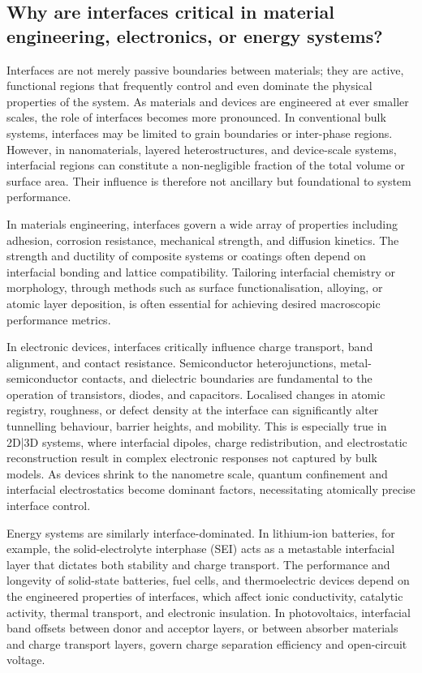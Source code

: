 \subsection{Why are interfaces critical in material engineering, electronics, or energy systems?}

Interfaces are not merely passive boundaries between materials; they are active, functional regions that frequently control and even dominate the physical properties of the system. As materials and devices are engineered at ever smaller scales, the role of interfaces becomes more pronounced. In conventional bulk systems, interfaces may be limited to grain boundaries or inter-phase regions. However, in nanomaterials, layered heterostructures, and device-scale systems, interfacial regions can constitute a non-negligible fraction of the total volume or surface area. Their influence is therefore not ancillary but foundational to system performance.

In materials engineering, interfaces govern a wide array of properties including adhesion, corrosion resistance, mechanical strength, and diffusion kinetics. The strength and ductility of composite systems or coatings often depend on interfacial bonding and lattice compatibility. Tailoring interfacial chemistry or morphology, through methods such as surface functionalisation, alloying, or atomic layer deposition, is often essential for achieving desired macroscopic performance metrics.

In electronic devices, interfaces critically influence charge transport, band alignment, and contact resistance. Semiconductor heterojunctions, metal-semiconductor contacts, and dielectric boundaries are fundamental to the operation of transistors, diodes, and capacitors. Localised changes in atomic registry, roughness, or defect density at the interface can significantly alter tunnelling behaviour, barrier heights, and mobility. This is especially true in 2D|3D systems, where interfacial dipoles, charge redistribution, and electrostatic reconstruction result in complex electronic responses not captured by bulk models. As devices shrink to the nanometre scale, quantum confinement and interfacial electrostatics become dominant factors, necessitating atomically precise interface control.

Energy systems are similarly interface-dominated. In lithium-ion batteries, for example, the solid-electrolyte interphase (SEI) acts as a metastable interfacial layer that dictates both stability and charge transport. The performance and longevity of solid-state batteries, fuel cells, and thermoelectric devices depend on the engineered properties of interfaces, which affect ionic conductivity, catalytic activity, thermal transport, and electronic insulation. In photovoltaics, interfacial band offsets between donor and acceptor layers, or between absorber materials and charge transport layers, govern charge separation efficiency and open-circuit voltage.

